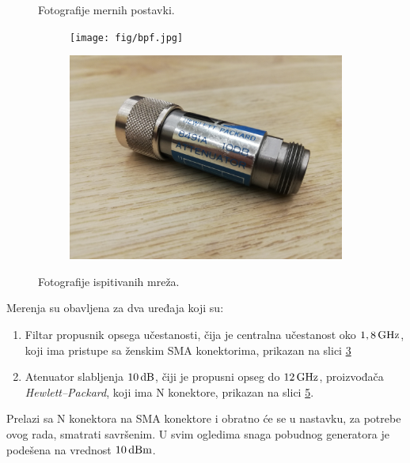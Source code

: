 \documentclass[a4paper, 12pt, diplomski]{etf}
\renewcommand{\unit}[1]{\,{\rm #1}}   %
\begin{document}
\begin{figure}[ht!]
\begin{subfigure}[b]{0.49\textwidth}
        \label{fig:setup2}
    \end{subfigure}
    \caption{Fotografije mernih postavki.}
\end{figure}
%
\begin{figure}[ht!]
    \begin{subfigure}[b]{0.49\textwidth}
        \centering
        \texttt{[image: fig/bpf.jpg]}
        \label{fig:bpf}
    \end{subfigure}
    \hfill
    \begin{subfigure}[b]{0.49\textwidth}
        \centering
        \includegraphics[width = 1\textwidth]{fig/att.jpg}
        \label{fig:att}
    \end{subfigure}
    \caption{Fotografije ispitivanih mreža.}
\end{figure}
%
Merenja su obavljena za dva uređaja koji su:
\begin{enumerate}[(U1)]
    \item 
Filtar propusnik opsega učestanosti, 
čija je centralna učestanost
oko $1,8\unit{GHz}$, koji ima pristupe sa ženskim SMA konektorima,
prikazan na slici \ref{fig:bpf}
\item Atenuator slabljenja 
$10\unit{dB}$, čiji je propusni opseg do 
$12\unit{GHz}$, proizvođača 
\textit{Hewlett--Packard}, koji ima N konektore, prikazan
na slici \ref{fig:att}. 
\end{enumerate}
Prelazi sa  
N konektora na SMA konektore i obratno će se u nastavku,
za potrebe ovog rada, smatrati savršenim. U 
svim ogledima snaga pobudnog generatora 
je podešena na vrednost $10\unit{dBm}$.
%
\end{document}
